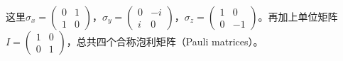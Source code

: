 这里$\sigma_x = \left( \begin{array}{ccc} 0 &  1 \\ 1 & 0 \end{array} \right) $，$\sigma_y = \left( \begin{array}{ccc} 0 &  -i \\ i & 0 \end{array} \right) $，$\sigma_z = \left( \begin{array}{ccc} 1 &  0 \\ 0 & -1 \end{array} \right) $。再加上单位矩阵$I =  \left( \begin{array}{ccc} 1 &  0 \\ 0 & 1 \end{array} \right)$，总共四个合称泡利矩阵（Pauli matrices）。